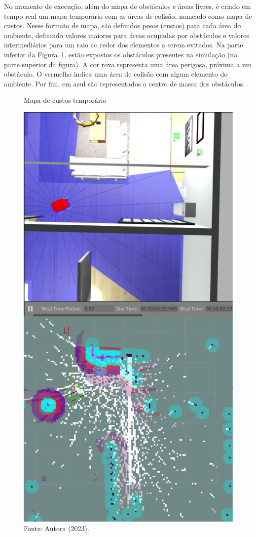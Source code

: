 No momento de execução, além do mapa de obstáculos e áreas livres, é criado em tempo real um mapa temporário com as áreas de colisão, nomeado como mapa de custos. Nesse formato de mapa, são definidos pesos (custos) para cada área do ambiente, definindo valores maiores para áreas ocupadas por obstáculos e valores intermediários para um raio ao redor dos elementos a serem evitados. Na parte inferior da Figura~\ref{fig:costmap}. estão expostos os obstáculos presentes na simulação (na parte superior da figura). A cor roxa representa uma área perigosa, próxima a um obstáculo. O vermelho indica uma área de colisão com algum elemento do ambiente. Por fim, em azul são representados o centro de massa dos obstáculos.

\begin{figure}[H]
    \centering
    \caption{Mapa de custos temporário}
    \includegraphics[scale=0.26]{costmap.png}
    \caption*{Fonte: Autora (2023).}
    \label{fig:costmap}
\end{figure}

